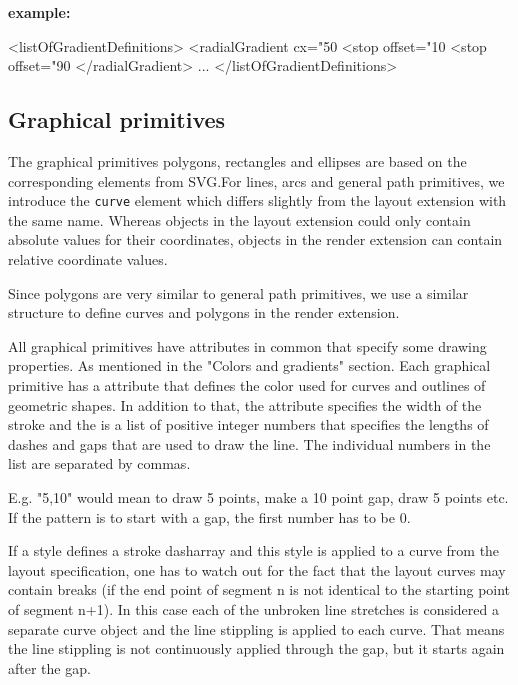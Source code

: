 {\large
  {\bf
example:
}
}

{\footnotesize
\begin{example}
<listOfGradientDefinitions>
  <radialGradient cx="50%
    <stop offset="10%
    <stop offset="90%
  </radialGradient>
       ...
</listOfGradientDefinitions>
\end{example}
}

\subsection{Graphical primitives}

The graphical primitives polygons, rectangles and ellipses are based on the 
corresponding elements from SVG.For lines, arcs and general path primitives, we 
introduce the \texttt{curve} element which differs slightly from the layout extension with the same name. 
Whereas \Point objects in the layout extension could only contain 
absolute values for their coordinates, \RenderPoint objects in the render extension 
can contain relative coordinate values. 

Since polygons are very similar to general path primitives, we use a similar structure to define curves and
polygons in the render extension.

All graphical primitives have attributes in common that specify some 
drawing properties. As mentioned in the "Colors and gradients" section. 
Each graphical primitive has a  attribute that defines the color used for curves 
and outlines of geometric shapes. In addition to that, the  
attribute specifies the width of the stroke and the  
is a list of positive integer numbers that specifies the lengths of dashes and 
gaps that are used to draw the line. The individual numbers in the list are separated by commas. 

E.g. "5,10" would mean to draw 5 points, make a 10 point gap, draw 5 points etc. If the pattern is to start with a gap, the first number has to be 0. 

If a style defines a stroke dasharray and this style is applied to a curve from the layout specification, one has to watch out for the fact that the layout curves may contain breaks (if the end point of segment n is not identical to the starting point of segment n+1). In this case each of the unbroken line stretches is considered a separate curve object and the line stippling is applied to each curve. That means the line stippling is not continuously applied through the gap, but it starts again after the gap.

